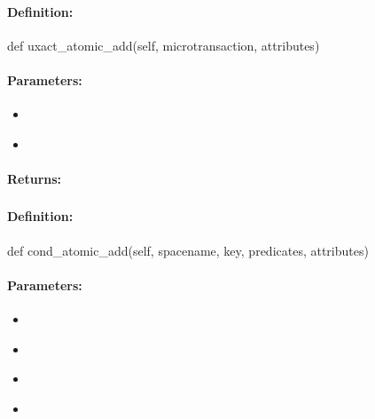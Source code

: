 \paragraph{Definition:}
\begin{pythoncode}
def uxact_atomic_add(self, microtransaction, attributes)
\end{pythoncode}

\paragraph{Parameters:}
\begin{itemize}[noitemsep]
\item {}\\

\item {}\\

\end{itemize}

\paragraph{Returns:}


\pagebreak
\subsubsection{}
\label{api:python:cond_atomic_add}


\paragraph{Definition:}
\begin{pythoncode}
def cond_atomic_add(self, spacename, key, predicates, attributes)
\end{pythoncode}

\paragraph{Parameters:}
\begin{itemize}[noitemsep]
\item {}\\

\item {}\\

\item {}\\

\item {}\\

\end{itemize}

